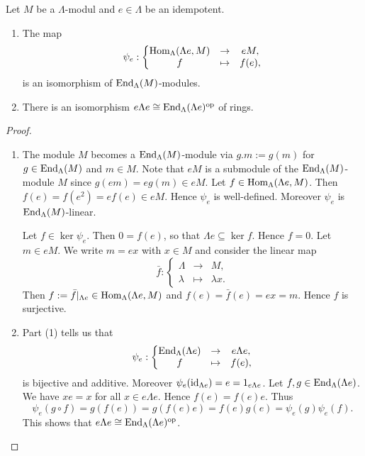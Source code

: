 
\begin{lemma}\label{1.4.4}
Let $M$ be a $\Lambda$-modul and $e\in \Lambda$ be an idempotent.
\begin{enumerate}
\item The map
\[
\psi_e :
\left\{
\begin{matrix}
\operatorname{Hom}_\Lambda(\Lambda e,M) & \to & eM,\\
f & \mapsto & f(e),
\end{matrix}
\right.
\]
is an isomorphism of $\operatorname{End}_\Lambda(M)$-modules.
\item There is an isomorphism $e\Lambda e \cong \operatorname{End}_\Lambda(\Lambda e)^{\mathrm{op}}$ of rings.
\end{enumerate}
\end{lemma}


\begin{proof}\
\begin{enumerate}
\item The module $M$ becomes a $\operatorname{End}_\Lambda(M)$-module via $g.m:=g(m)$ for $g\in \operatorname{End}_\Lambda(M)$ and $m\in M$. Note that $eM$ is a submodule of the $\operatorname{End}_\Lambda(M)$-module $M$ since $g(em)=eg(m)\in eM$. 
Let $f\in\operatorname{Hom}_\Lambda(\Lambda e,M)$. Then $f(e)=f(e^2)=ef(e)\in eM$. Hence $\psi_e$ is well-defined.
Moreover $\psi_e$ is $\operatorname{End}_\Lambda(M)$-linear. 

Let $f\in\ker\psi_e$. Then $0=f(e)$, so that $\Lambda e\subseteq \ker f$. Hence $f=0$. Let $m\in eM$. We write $m=ex$ with $x\in M$ and consider the linear map
\[
\bar f:
\left\{
\begin{matrix}
\Lambda & \to & M,\\
\lambda & \mapsto & \lambda x.
\end{matrix}
\right.
\]
Then $f:=\bar f|_{\Lambda e}\in \operatorname{Hom}_\Lambda(\Lambda e,M)$ and $f(e) = \bar f(e)=ex=m$. Hence $f$ is surjective.
\item Part (1) tells us that
\[
\psi_e :
\left\{
\begin{matrix}
\operatorname{End}_\Lambda(\Lambda e) & \to & e\Lambda e,\\
f & \mapsto & f(e),
\end{matrix}
\right.
\]
is bijective and additive. Moreover $\psi_e(\operatorname{id}_{\Lambda e})=e=1_{e\Lambda e}$. Let $f,g\in\operatorname{End}_\Lambda(\Lambda e)$. We have $xe=x$ for all $x\in e\Lambda e$. Hence $f(e)=f(e)e$. Thus
\[
\psi_e(g\circ f)=g(f(e))=g(f(e)e)=f(e)g(e)=\psi_e(g)\psi_e(f).
\]
This shows that $e\Lambda e \cong \operatorname{End}_\Lambda(\Lambda e)^{\mathrm{op}}$.\qedhere
\end{enumerate}
\end{proof}

